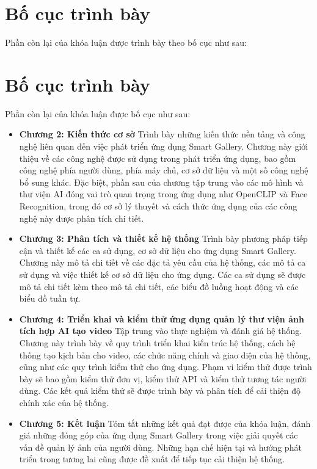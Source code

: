 \section{Bố cục trình bày}

Phần còn lại của khóa luận được trình bày theo bố cục như sau: 


\section{Bố cục trình bày}
Phần còn lại của khóa luận được bố cục như sau:
\begin{itemize}
    \item \textbf{Chương 2: Kiến thức cơ sở}\newline
    Trình bày những kiến thức nền tảng và công nghệ liên quan đến việc phát triển ứng dụng Smart Gallery. Chương này giới thiệu về các công nghệ được sử dụng trong phát triển ứng dụng, bao gồm công nghệ phía người dùng, phía máy chủ, cơ sở dữ liệu và một số công nghệ bổ sung khác. Đặc biệt, phần sau của chương tập trung vào các mô hình và thư viện AI đóng vai trò quan trọng trong ứng dụng như OpenCLIP và Face Recognition, trong đó cơ sở lý thuyết và cách thức ứng dụng của các công nghệ này được phân tích chi tiết.

    \item \textbf{Chương 3: Phân tích và thiết kế hệ thống}\newline
    Trình bày phương pháp tiếp cận và thiết kế các ca sử dụng, cơ sở dữ liệu cho ứng dụng Smart Gallery. Chương này mô tả chi tiết về các đặc tả yêu cầu của hệ thống, các mô tả ca sử dụng và việc thiết kế cơ sở dữ liệu cho ứng dụng. Các ca sử dụng sẽ được mô tả chi tiết kèm theo mô tả chi tiết, các biểu đồ luồng hoạt động và các biểu đồ tuần tự.

    \item \textbf{Chương 4: Triển khai và kiểm thử ứng dụng quản lý thư viện ảnh tích hợp AI tạo video}\newline
    Tập trung vào thực nghiệm và đánh giá hệ thống. Chương này trình bày về quy trình triển khai kiến trúc hệ thống, cách hệ thống tạo kịch bản cho video, các chức năng chính và giao diện của hệ thống, cũng như các quy trình kiểm thử cho ứng dụng. Phạm vi kiểm thử được trình bày sẽ bao gồm kiểm thử đơn vị, kiểm thử API và kiểm thử tương tác người dùng. Các kết quả kiểm thử sẽ được trình bày và phân tích để cải thiện độ chính xác của hệ thống. 

    \item \textbf{Chương 5: Kết luận}\newline
    Tóm tắt những kết quả đạt được của khóa luận, đánh giá những đóng góp của ứng dụng Smart Gallery trong việc giải quyết các vấn đề quản lý ảnh của người dùng. Những hạn chế hiện tại và hướng phát triển trong tương lai cũng được đề xuất để tiếp tục cải thiện hệ thống.
\end{itemize}